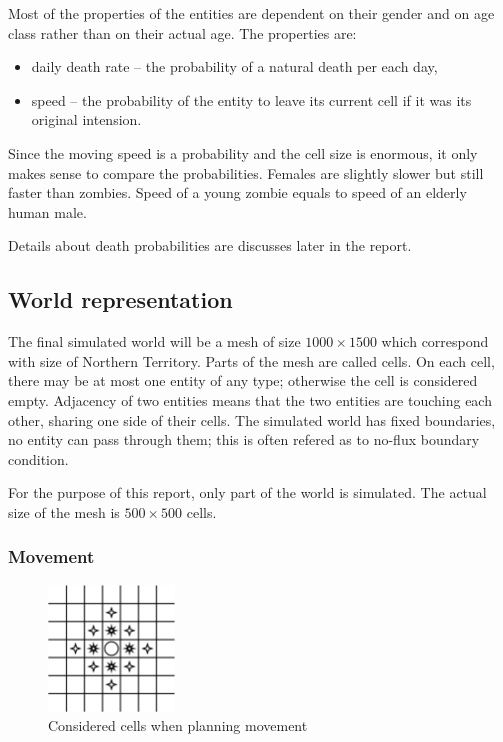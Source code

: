 \documentclass[a4paper]{article}
\begin{document}
Most of the properties of the entities are dependent on their gender and on age class rather than on their actual age.
The properties are:
\begin{itemize}
\item daily death rate -- the probability of a natural death per each day,
\item speed -- the probability of the entity to leave its current cell if it was its original intension.
\end{itemize}

Since the moving speed is a probability and the cell size is enormous, it only makes sense to compare the probabilities.
Females are slightly slower but still faster than zombies.
Speed of a young zombie equals to speed of an elderly human male.

Details about death probabilities are discusses later in the report.

\subsection{World representation}

The final simulated world will be a mesh of size $1000 \times 1500$ which correspond with size of Northern Territory. \cite{northernterritory}
Parts of the mesh are called cells.
On each cell, there may be at most one entity of any type; otherwise the cell is considered empty.
Adjacency of two entities means that the two entities are touching each other, sharing one side of their cells.
The simulated world has fixed boundaries, no entity can pass through them; this is often refered as to no-flux boundary condition.

For the purpose of this report, only part of the world is simulated.
The actual size of the mesh is $500 \times 500$ cells.

\subsubsection{Movement}

\begin{figure}[ht]
    \centering
    \includegraphics[width=0.3\textwidth]{movement}
    \caption{Considered cells when planning movement}
\end{figure}
\end{document}
